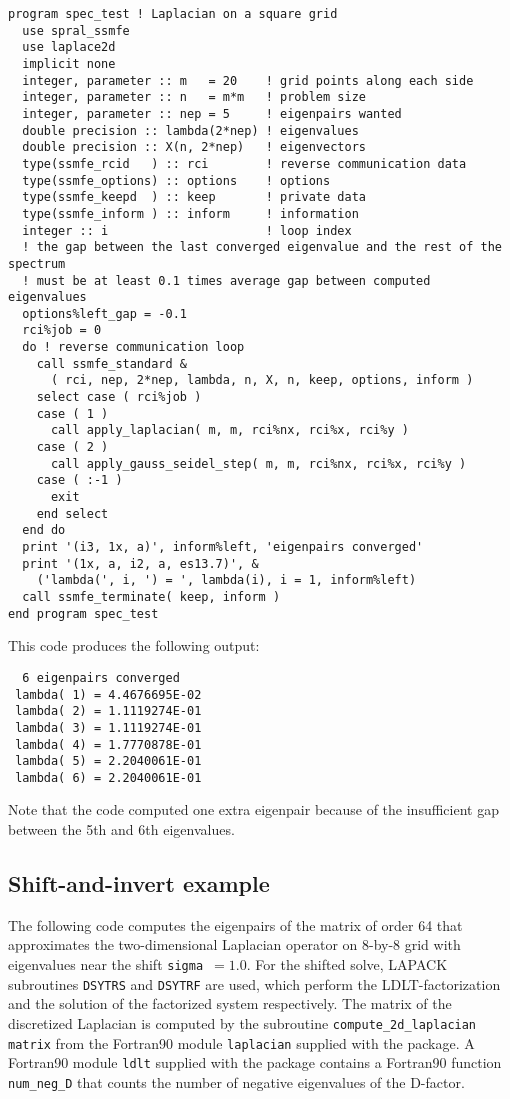 \documentclass{spral}
\begin{document}
\begin{verbatim}
program spec_test ! Laplacian on a square grid
  use spral_ssmfe
  use laplace2d
  implicit none
  integer, parameter :: m   = 20    ! grid points along each side
  integer, parameter :: n   = m*m   ! problem size
  integer, parameter :: nep = 5     ! eigenpairs wanted
  double precision :: lambda(2*nep) ! eigenvalues
  double precision :: X(n, 2*nep)   ! eigenvectors
  type(ssmfe_rcid   ) :: rci        ! reverse communication data
  type(ssmfe_options) :: options    ! options
  type(ssmfe_keepd  ) :: keep       ! private data
  type(ssmfe_inform ) :: inform     ! information
  integer :: i                      ! loop index
  ! the gap between the last converged eigenvalue and the rest of the spectrum
  ! must be at least 0.1 times average gap between computed eigenvalues
  options%left_gap = -0.1
  rci%job = 0
  do ! reverse communication loop
    call ssmfe_standard &
      ( rci, nep, 2*nep, lambda, n, X, n, keep, options, inform )
    select case ( rci%job )
    case ( 1 )
      call apply_laplacian( m, m, rci%nx, rci%x, rci%y )
    case ( 2 )
      call apply_gauss_seidel_step( m, m, rci%nx, rci%x, rci%y )
    case ( :-1 )
      exit
    end select
  end do
  print '(i3, 1x, a)', inform%left, 'eigenpairs converged'
  print '(1x, a, i2, a, es13.7)', &
    ('lambda(', i, ') = ', lambda(i), i = 1, inform%left)
  call ssmfe_terminate( keep, inform )
end program spec_test
\end{verbatim}

This code produces the following output:

\begin{verbatim}
  6 eigenpairs converged
 lambda( 1) = 4.4676695E-02
 lambda( 2) = 1.1119274E-01
 lambda( 3) = 1.1119274E-01
 lambda( 4) = 1.7770878E-01
 lambda( 5) = 2.2040061E-01
 lambda( 6) = 2.2040061E-01
\end{verbatim}

Note that the code computed one extra eigenpair
because of the insufficient gap between the 5th and 6th
eigenvalues.

\subsection{Shift-and-invert example}
\label{sec:ex.si}

The following code 
computes the eigenpairs of 
the matrix of order 64 that approximates 
the two-dimensional Laplacian operator
on 8-by-8 grid
with eigenvalues near the shift {\tt sigma $=1.0$}.
For the shifted solve, LAPACK subroutines {\tt DSYTRS} and
{\tt DSYTRF} are used,
which perform the LDLT-factorization and
the solution of the factorized system respectively.
The matrix of the discretized Laplacian is computed
by the subroutine {\tt compute\_2d\_laplacian matrix}
from the Fortran90 module {\tt laplacian}
supplied with the package.
A Fortran90 module {\tt ldlt} supplied with the package
contains a Fortran90 function {\tt num\_neg\_D}
that counts the number of negative eigenvalues of
the D-factor.
\end{document}
